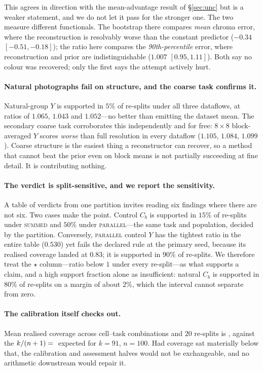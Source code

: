 \documentclass[10pt,conference]{article}
\begin{document}
This agrees in direction with the mean-advantage result of \S\ref{sec:unc} but is a
weaker statement, and we do not let it pass for the stronger one. The two measure
different functionals. The bootstrap there compares \emph{mean} chroma error, where the
reconstruction is resolvably worse than the constant predictor ($-0.34$ $[-0.51,
-0.18]$); the ratio here compares the \emph{90th-percentile} error, where reconstruction
and prior are indistinguishable ($1.007$ $[0.95, 1.11]$). Both say no colour was
recovered; only the first says the attempt actively hurt.

\paragraph{Natural photographs fail on structure, and the coarse task confirms it.}
Natural-group $Y$ is supported in $5\%$ of re-splits under all three dataflows, at ratios
of $1.065$, $1.043$ and $1.052$---no better than emitting the dataset mean. The secondary
coarse task corroborates this independently and for free: $8\times8$ block-averaged $Y$
scores \emph{worse} than full resolution in every dataflow ($1.105$, $1.084$, $1.099$).
Coarse structure is the easiest thing a reconstructor can recover, so a method that
cannot beat the prior even on block means is not partially succeeding at fine detail. It
is contributing nothing.

\paragraph{The verdict is split-sensitive, and we report the sensitivity.} A table of
verdicts from one partition invites reading six findings where there are not six. Two
cases make the point. Control $C_b$ is supported in $15\%$ of re-splits under
\textsc{summed} and $50\%$ under \textsc{parallel}---the same task and population,
decided by the partition. Conversely, \textsc{parallel} control $Y$ has the tightest
ratio in the entire table ($0.530$) yet fails the declared rule at the primary seed,
because its realised coverage landed at $0.83$; it is supported in $90\%$ of re-splits.
We therefore treat the $\star$ column---ratio below $1$ under every re-split---as what
supports a claim, and a high support fraction alone as insufficient: natural $C_b$ is
supported in $80\%$ of re-splits on a margin of about $2\%$, which the interval cannot
separate from zero.

\paragraph{The calibration itself checks out.} Mean realised coverage across
\unskip{} cell--task combinations and $20$ re-splits is
\unskip{}, against the $k/(n+1) =
\unskip{}$ expected for $k=91$, $n=100$. Had coverage
sat materially below that, the calibration and assessment halves would not be
exchangeable, and no arithmetic downstream would repair it.
\end{document}
